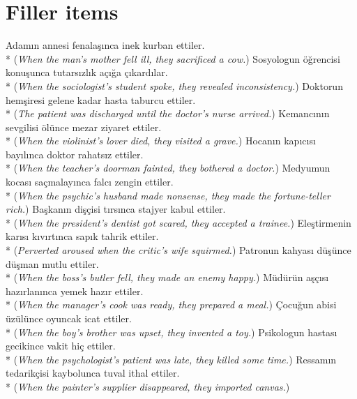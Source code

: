 \section{Filler items}
\ea Adam{\i}n annesi fenala\c{s}{\i}nca inek kurban ettiler.\\*
({\it When the man's mother fell ill, they sacrificed a cow.})
\ex Sosyologun \"{o}\u{g}rencisi konu\c{s}unca tutars{\i}zl{\i}k a\c{c}{\i}\u{g}a \c{c}{\i}kard{\i}lar.\\*
({\it When the sociologist's student spoke, they revealed inconsistency.})
\ex Doktorun hem\c{s}iresi gelene kadar hasta taburcu ettiler.\\*
({\it The patient was discharged until the doctor's nurse arrived.})
\ex Kemanc{\i}n{\i}n sevgilisi \"{o}l\"{u}nce mezar ziyaret ettiler.\\*
({\it When the violinist's lover died, they visited a grave.})
\ex Hocan{\i}n kap{\i}c{\i}s{\i} bay{\i}l{\i}nca doktor rahats{\i}z ettiler.\\*
({\it When the teacher's doorman fainted, they bothered a doctor.})
\ex Medyumun kocas{\i} sa\c{c}malay{\i}nca falc{\i} zengin ettiler.\\*
({\it When the psychic's husband made nonsense, they made the fortune-teller rich.})
\ex Ba\c{s}kan{\i}n di\c{s}\c{c}isi t{\i}rs{\i}nca stajyer kabul ettiler.\\*
({\it When the president's dentist got scared, they accepted a trainee.})
\ex Ele\c{s}tirmenin kar{\i}s{\i} k{\i}v{\i}rt{\i}nca sap{\i}k tahrik ettiler.\\*
({\it Perverted aroused when the critic's wife squirmed.})
\ex Patronun kahyas{\i} d\"{u}\c{s}\"{u}nce d\"{u}\c{s}man mutlu ettiler.\\*
({\it When the boss's butler fell, they made an enemy happy.})
\ex M\"{u}d\"{u}r\"{u}n a\c{s}\c{c}{\i}s{\i} haz{\i}rlan{\i}nca yemek haz{\i}r ettiler.\\*
({\it When the manager's cook was ready, they prepared a meal.})
\ex \c{C}ocu\u{g}un abisi \"{u}z\"{u}l\"{u}nce oyuncak icat ettiler.\\*
({\it When the boy's brother was upset, they invented a toy.})
\ex Psikologun hastas{\i} gecikince vakit hi\c{c} ettiler.\\*
({\it When the psychologist's patient was late, they killed some time.})
\ex Ressam{\i}n tedarik\c{c}isi kaybolunca tuval ithal ettiler.\\*
({\it When the painter's supplier disappeared, they imported canvas.})
